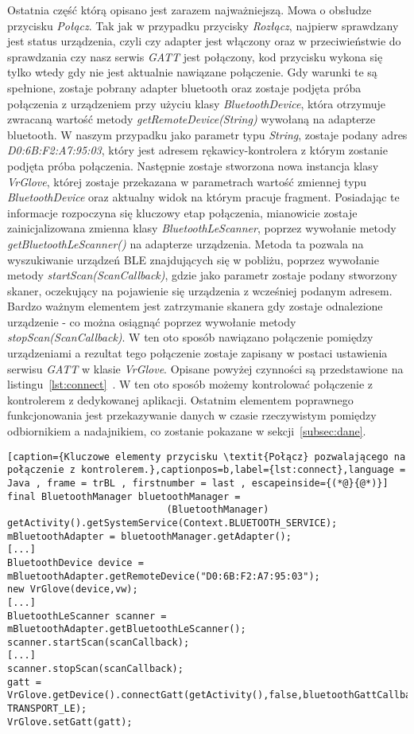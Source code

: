 Ostatnia część którą opisano jest zarazem najważniejszą. Mowa o obsłudze przycisku \textit{Połącz}. Tak jak w przypadku przycisky \textit{Rozłącz}, najpierw sprawdzany jest status urządzenia, czyli czy adapter jest włączony oraz w przeciwieństwie do sprawdzania czy nasz serwis \textit{GATT} jest połączony, kod przycisku wykona się tylko wtedy gdy nie jest aktualnie nawiązane połączenie. Gdy warunki te są spełnione, zostaje pobrany adapter bluetooth oraz zostaje podjęta próba połączenia z urządzeniem przy użyciu klasy \textit{BluetoothDevice}, która otrzymuje zwracaną wartość metody \textit{getRemoteDevice(String)} wywołaną na adapterze bluetooth. W naszym przypadku jako parametr typu \textit{String}, zostaje podany adres \textit{D0:6B:F2:A7:95:03}, który jest adresem rękawicy-kontrolera z którym zostanie podjęta próba połączenia. Następnie zostaje stworzona nowa instancja klasy \textit{VrGlove}, której zostaje przekazana w parametrach wartość zmiennej typu \textit{BluetoothDevice} oraz aktualny widok na którym pracuje fragment. Posiadając te informacje rozpoczyna się kluczowy etap połączenia, mianowicie zostaje zainicjalizowana zmienna klasy \textit{BluetoothLeScanner}, poprzez wywołanie metody \textit{getBluetoothLeScanner()} na adapterze urządzenia. Metoda ta pozwala na wyszukiwanie urządzeń BLE znajdujących się w pobliżu, poprzez wywołanie metody \textit{startScan(ScanCallback)}, gdzie jako parametr zostaje podany stworzony skaner, oczekujący na pojawienie się urządzenia z wcześniej podanym adresem. Bardzo ważnym elementem jest zatrzymanie skanera gdy zostaje odnalezione urządzenie - co można osiągnąć poprzez wywołanie metody \textit{stopScan(ScanCallback)}. W ten oto sposób nawiązano połączenie pomiędzy urządzeniami a rezultat tego połączenie zostaje zapisany w postaci ustawienia serwisu \textit{GATT} w klasie \textit{VrGlove}. Opisane powyżej czynności są przedstawione na listingu~\ref{lst:connect}~\cite{AndroidDoc}. W ten oto sposób możemy kontrolować połączenie z kontrolerem z dedykowanej aplikacji. Ostatnim elementem poprawnego funkcjonowania jest przekazywanie danych w czasie rzeczywistym pomiędzy odbiornikiem a nadajnikiem, co zostanie pokazane w sekcji~\ref{subsec:dane}. \newpage
\begin{lstlisting}[caption={Kluczowe elementy przycisku \textit{Połącz} pozwalającego na połączenie z kontrolerem.},captionpos=b,label={lst:connect},language = Java , frame = trBL , firstnumber = last , escapeinside={(*@}{@*)}]
final BluetoothManager bluetoothManager =
                            (BluetoothManager) getActivity().getSystemService(Context.BLUETOOTH_SERVICE);
mBluetoothAdapter = bluetoothManager.getAdapter();
[...]
BluetoothDevice device = mBluetoothAdapter.getRemoteDevice("D0:6B:F2:A7:95:03");
new VrGlove(device,vw);                    
[...]
BluetoothLeScanner scanner = mBluetoothAdapter.getBluetoothLeScanner();
scanner.startScan(scanCallback);
[...]
scanner.stopScan(scanCallback);
gatt = VrGlove.getDevice().connectGatt(getActivity(),false,bluetoothGattCallback, TRANSPORT_LE);
VrGlove.setGatt(gatt);                                                           
\end{lstlisting} 

